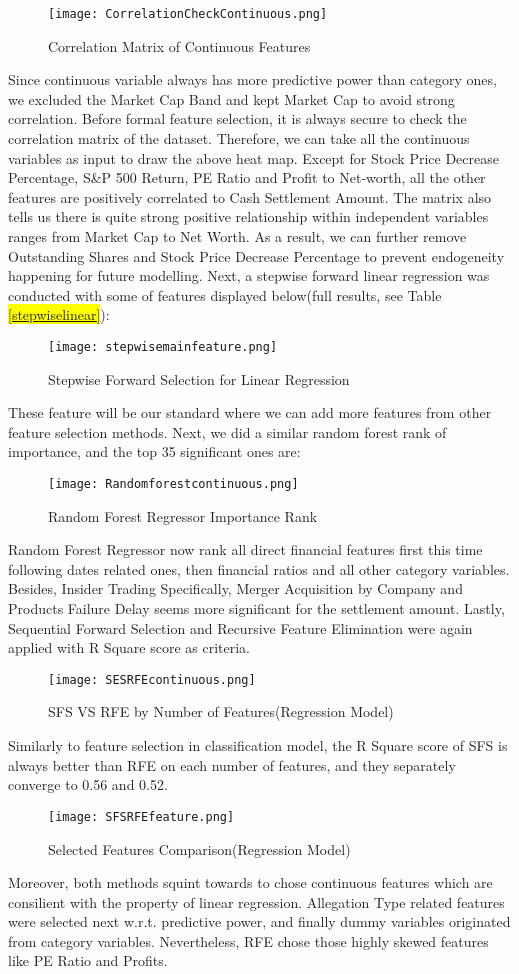\begin{figure}[H]
  \centering
  \texttt{[image: CorrelationCheckContinuous.png]}
  \caption{Correlation Matrix of Continuous Features}
\end{figure}
Since continuous variable always has more predictive power than category ones, we excluded the Market Cap Band and kept Market Cap to avoid strong correlation. Before formal feature selection, it is always secure to check the correlation matrix of the dataset. Therefore, we can take all the continuous variables as input to draw the above heat map. Except for Stock Price Decrease Percentage, S\&P 500 Return, PE Ratio and Profit to Net-worth, all the other features are positively correlated to Cash Settlement Amount. The matrix also tells us there is quite strong positive relationship within independent variables ranges from Market Cap to Net Worth. As a result, we can further remove Outstanding Shares and Stock Price Decrease Percentage to prevent endogeneity happening for future modelling. Next, a stepwise forward  linear regression was conducted with some of features displayed below(full results, see Table \hl{\ref{stepwiselinear}}):
\begin{figure}[H]
  \centering
  \texttt{[image: stepwisemainfeature.png]}
  \caption{Stepwise Forward Selection for Linear Regression}
\end{figure}
These feature will be our standard where we can add more features from other feature selection methods. Next, we did a similar random forest rank of importance, and the top 35 significant ones are:
\begin{figure}[H]
  \centering
  \texttt{[image: Randomforestcontinuous.png]}
  \caption{Random Forest Regressor Importance Rank}
\end{figure}
Random Forest Regressor now rank all direct financial features first this time following dates related ones, then financial ratios and all other category variables. Besides, Insider Trading Specifically, Merger Acquisition by Company and Products Failure Delay seems more significant for the settlement amount. Lastly, Sequential Forward Selection and Recursive Feature Elimination were again applied with R Square score as criteria. 
\begin{figure}[H]
  \centering
  \texttt{[image: SESRFEcontinuous.png]}
  \caption{SFS VS RFE by Number of Features(Regression Model)}
\end{figure}
Similarly to feature selection in classification model, the R Square score of SFS is always better than RFE on each number of features, and they separately converge to 0.56 and 0.52. 
\begin{figure}[H]
  \centering
  \texttt{[image: SFSRFEfeature.png]}
  \caption{Selected Features Comparison(Regression Model)}
\end{figure}
Moreover, both methods squint towards to chose continuous features which are consilient with the property of linear regression. Allegation Type related features were selected next w.r.t. predictive power, and finally dummy variables originated from category variables. Nevertheless, RFE chose those highly skewed features like PE Ratio and Profits. 
